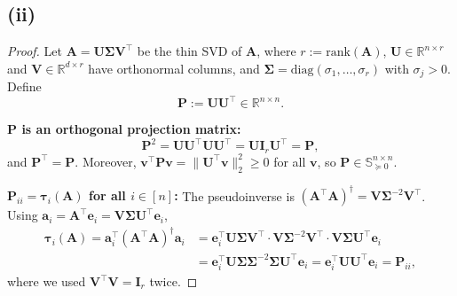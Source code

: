 \subsection*{(ii)}

\begin{proof}
Let $\mathbf{A} = \mathbf{U}\boldsymbol{\Sigma}\mathbf{V}^\top$ be the thin SVD of $\mathbf{A}$, where $r := \mathrm{rank}(\mathbf{A})$, $\mathbf{U} \in \mathbb{R}^{n \times r}$ and $\mathbf{V} \in \mathbb{R}^{d \times r}$ have orthonormal columns, and $\boldsymbol{\Sigma} = \mathrm{diag}(\sigma_1,\ldots,\sigma_r)$ with $\sigma_j > 0$. Define
\[
    \mathbf{P} := \mathbf{U}\mathbf{U}^\top \in \mathbb{R}^{n \times n}.
\]

\textbf{$\mathbf{P}$ is an orthogonal projection matrix:}
\[
    \mathbf{P}^2 = \mathbf{U}\mathbf{U}^\top\mathbf{U}\mathbf{U}^\top = \mathbf{U}\mathbf{I}_r\mathbf{U}^\top = \mathbf{P},
\]
and $\mathbf{P}^\top = \mathbf{P}$. Moreover, $\mathbf{v}^\top \mathbf{P} \mathbf{v} = \|\mathbf{U}^\top \mathbf{v}\|_2^2 \geq 0$ for all $\mathbf{v}$, so $\mathbf{P} \in \mathbb{S}_{\succeq 0}^{n \times n}$.

\textbf{$\mathbf{P}_{ii} = \boldsymbol{\tau}_i(\mathbf{A})$ for all $i \in [n]$:} The pseudoinverse is $(\mathbf{A}^\top\mathbf{A})^\dagger = \mathbf{V}\boldsymbol{\Sigma}^{-2}\mathbf{V}^\top$. Using $\mathbf{a}_i = \mathbf{A}^\top \mathbf{e}_i = \mathbf{V}\boldsymbol{\Sigma}\mathbf{U}^\top\mathbf{e}_i$,
\begin{align*}
    \boldsymbol{\tau}_i(\mathbf{A})
    = \mathbf{a}_i^\top (\mathbf{A}^\top\mathbf{A})^\dagger \mathbf{a}_i
    &= \mathbf{e}_i^\top \mathbf{U}\boldsymbol{\Sigma}\mathbf{V}^\top \cdot \mathbf{V}\boldsymbol{\Sigma}^{-2}\mathbf{V}^\top \cdot \mathbf{V}\boldsymbol{\Sigma}\mathbf{U}^\top\mathbf{e}_i \\
    &= \mathbf{e}_i^\top \mathbf{U}\boldsymbol{\Sigma}\boldsymbol{\Sigma}^{-2}\boldsymbol{\Sigma}\mathbf{U}^\top\mathbf{e}_i
    = \mathbf{e}_i^\top \mathbf{U}\mathbf{U}^\top\mathbf{e}_i
    = \mathbf{P}_{ii},
\end{align*}
where we used $\mathbf{V}^\top\mathbf{V} = \mathbf{I}_r$ twice.
\end{proof}
